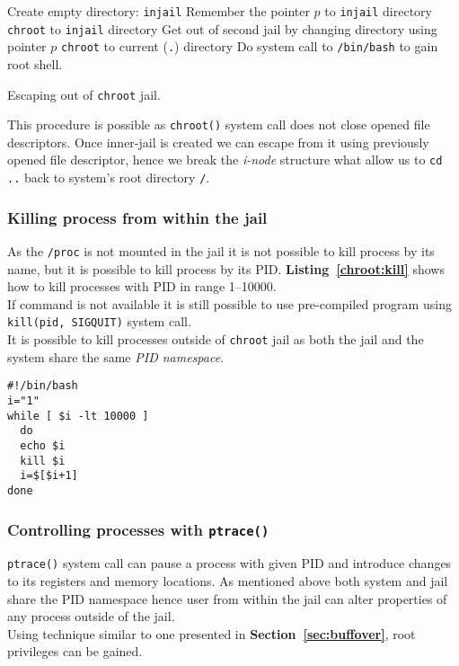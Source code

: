\documentclass[12pt, a4paper, pdflatex]{article}
\begin{document}
\SetAlCapSkip{1em}
\LinesNumbered
{}
\vspace{1em}
\begin{algorithm}[h]
  Create empty directory: \texttt{injail}\;
  Remember the pointer $p$ to \texttt{injail} directory\;
  \texttt{chroot} to \texttt{injail} directory\;
  Get out of second jail by changing directory using pointer $p$\;
  \texttt{chroot} to current (\texttt{.}) directory\;
  Do system call to \texttt{/bin/bash} to gain root shell.
  \caption{Escaping out of \texttt{chroot} jail.\label{alg:chroot:cd}}
\end{algorithm}
\vspace{1em}

This procedure is possible as \texttt{chroot()} system call does not close opened file descriptors. Once inner-jail is created we can escape from it using previously opened file descriptor, hence we break the \emph{i-node} structure what allow us to \texttt{cd ..} back to system's root directory \texttt{/}.

\subsubsection{Killing process from within the jail}
As the \texttt{/proc} is not mounted in the jail it is not possible to kill process by its name, but it is possible to kill process by its PID. \textbf{Listing~\ref{chroot:kill}} shows how to kill processes with PID in range 1--10000.\\
If command is not available it is still possible to use pre-compiled program using \texttt{kill(pid, SIGQUIT)} system call.\\
It is possible to kill processes outside of \texttt{chroot} jail as both the jail and the system share the same \emph{PID namespace}.


\vspace{1em}
\lstset{
  captionpos=b,
  frame=single,
  language=bash,
  breaklines=true,
  caption=Kill processes outside of chroot jail.,
  label=chroot:kill,
  float=tb
}
\begin{lstlisting}
#!/bin/bash
i="1"
while [ $i -lt 10000 ]
  do
  echo $i
  kill $i
  i=$[$i+1]
done
\end{lstlisting}

\subsubsection{Controlling processes with \texttt{ptrace()}}
\texttt{ptrace()} system call can pause a process with given PID and introduce changes to its registers and memory locations. As mentioned above both system and jail share the PID namespace hence user from within the jail can alter properties of any process outside of the jail.\\
Using technique similar to one presented in \textbf{Section~\ref{sec:buffover}}, root privileges can be gained.
\end{document}
